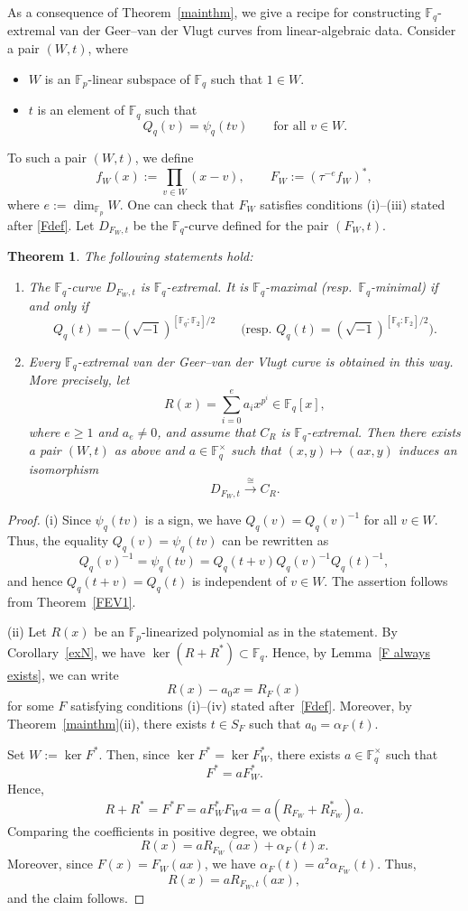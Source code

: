 \documentclass[12pt,a4paper]{amsart}
\newtheorem{theorem}{Theorem}[section]
\theoremstyle{definition}
\def\F{{\mathbb F}}
\theoremstyle{remark}
\begin{document}
As a consequence of Theorem~\ref{mainthm}, we give a recipe for constructing $\F_q$-extremal van der Geer--van der Vlugt curves from linear-algebraic data. 
Consider a pair $(W,t)$, where 
\begin{itemize}
    \item $W$ is an $\F_p$-linear subspace of $\F_q$ such that $1\in W$. 
    \item $t$ is an element of $\F_q$ such that 
    \[
    Q_q(v)=\psi_q(tv)\qquad\text{for all } v\in W. 
    \]
\end{itemize}
To such a pair $(W,t)$, we define 
\[
f_W(x):=\prod_{v\in W}(x-v),\qquad F_W:=(\tau^{-e}f_W)^\ast, 
\]
where $e:=\dim_{\F_p}W$. One can check that $F_W$ satisfies conditions \textup{(i)--(iii)} stated after \eqref{Fdef}. 
Let $D_{F_W,t}$ be the $\F_q$-curve defined for the pair $(F_W,t)$. 
\begin{theorem}\label{recipe for ex curve}
The following statements hold: 
\begin{enumerate}
    \item The $\F_q$-curve $D_{F_W,t}$ is $\F_q$-extremal. It is $\F_q$-maximal (resp.\ $\F_q$-minimal) if and only if 
    \[
    Q_q(t)=-(\sqrt{-1})^{[\F_q:\F_2]/2}\qquad\text{(resp.\ }Q_q(t)=(\sqrt{-1})^{[\F_q:\F_2]/2}\text{)}. 
    \]
    \item Every $\F_q$-extremal van der Geer--van der Vlugt curve is obtained in this way. More precisely, let 
\[R(x)=\sum_{i=0}^e a_i x^{p^i} \in 
 \F_q[x],\]
 where $e\geq1$ and $a_e\neq0$, and assume that $C_R$ is $\F_q$-extremal. Then there exists a pair $(W,t)$ as above and $a\in\F_q^\times$ such that $(x,y)\mapsto (ax,y)$ induces an isomorphism 
 \[
 D_{F_W,t}\xrightarrow{\cong}C_R. 
 \]
\end{enumerate}
\end{theorem}
\begin{proof}
(i)  Since $\psi_q(tv)$ is a sign, we have $Q_q(v)=Q_q(v)^{-1}$ for all $v\in W$. Thus, the equality $Q_q(v)=\psi_q(tv)$ can be rewritten as 
\[
Q_q(v)^{-1}=\psi_q(tv)=Q_q(t+v)Q_q(v)^{-1}Q_q(t)^{-1}, 
\]
and hence $Q_q(t+v)=Q_q(t)$ is independent of $v\in W$. The assertion follows from Theorem~\ref{FEV1}. 

\medskip 

\noindent
(ii) Let $R(x)$ be an $\F_p$-linearized polynomial as in the statement. By Corollary~\ref{exN}, we have $\ker(R+R^\ast)\subset \F_q$. Hence, by Lemma~\ref{F always exists}, 
    we can write 
    \[
    R(x)-a_0x=R_{F}(x)
    \]
    for some $F$ satisfying conditions \textup{(i)--(iv)} stated after~\eqref{Fdef}. Moreover, by Theorem~\ref{mainthm}(ii), there exists $t\in S_{F}$ such that $a_0=\alpha_{F}(t)$. 

    Set $W:=\ker F^\ast$. Then, since $\ker F^\ast=\ker F_W^\ast$,  there exists $a\in\F_q^\times$ such that 
    \[
    F^\ast=aF_W^\ast. 
    \]
    Hence, 
    \[
    R+R^\ast=F^\ast F=aF_W^\ast F_W a=a(R_{F_W}+R_{F_W}^\ast)a. 
    \]
    Comparing the coefficients in positive degree, we obtain 
    \[
    R(x)=aR_{F_W}(ax)+\alpha_F(t)x. 
    \]
    Moreover, since $F(x)=F_W(ax)$, we have $\alpha_F(t)=a^2\alpha_{F_W}(t)$. Thus, 
    \[
    R(x)=aR_{F_W,t}(ax), 
    \]
    and the claim follows. 
\end{proof}
\end{document}
